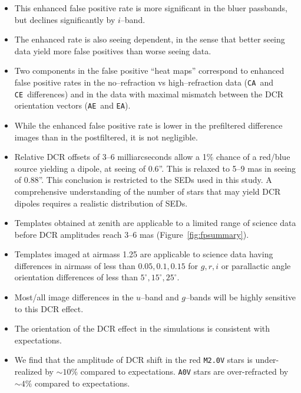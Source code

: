 \documentclass[DM,toc]{lsstdoc}
\def\A{{\tt A}}
\def\C{{\tt C}}
\def\E{{\tt E}}
\begin{document}
\begin{itemize}
\item This enhanced false positive rate is more significant in the
  bluer passbands, but declines significantly by $i$--band.

\item The enhanced rate is also seeing dependent, in the sense that
  better seeing data yield more false positives than worse seeing
  data.

\item Two components in the false positive ``heat maps'' correspond to
  enhanced false positive rates in the no--refraction vs
  high--refraction data (\C\A\ and \C\E\ differences) and in the data
  with maximal mismatch between the DCR orientation vectors (\A\E\ and
  \E\A).

\item While the enhanced false positive rate is lower in the
  prefiltered difference images than in the postfiltered, it is not
  negligible.

\item Relative DCR offsets of 3--6 milliarcseconds allow a 1\% chance
  of a red/blue source yielding a dipole, at seeing of 0.6''.  This is
  relaxed to 5--9 mas in seeing of 0.88''.  This conclusion is
  restricted to the SEDs used in this study.  A comprehensive
  understanding of the number of stars that may yield DCR dipoles
  requires a realistic distribution of SEDs.

\item Templates obtained at zenith are applicable to a limited range
  of science data before DCR amplitudes reach 3--6 mas
  (Figure~\ref{fig:fpsummary}).

\item Templates imaged at airmass 1.25 are applicable to science data
  having differences in airmass of less than $0.05, 0.1, 0.15$ for
  $g,r,i$ or parallactic angle orientation differences of less than
  $5^{\circ}, 15^{\circ}, 25^{\circ}$.

\item Most/all image differences in the $u$--band and $g$--bands will
  be highly sensitive to this DCR effect.

\item The orientation of the DCR effect in the simulations is
  consistent with expectations.

\item We find that the amplitude of DCR shift in the red {\tt M2.0V}
  stars is under-realized by $\sim 10\%$ compared to expectations.
  {\tt A0V} stars are over-refracted by $\sim 4\%$ compared to
  expectations.


\end{itemize}
\end{document}
